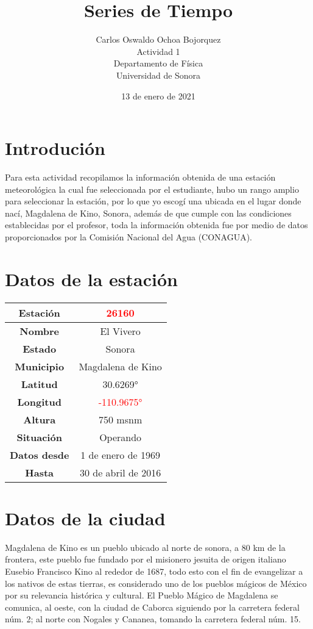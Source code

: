 \documentclass{article}
\title{Series de Tiempo}
\author{Carlos Oswaldo Ochoa Bojorquez\\
Actividad 1\\
Departamento de Física\\
Universidad de Sonora}
\date{13 de enero de 2021}
\begin{document}
\maketitle

\section{Introdución}
Para esta actividad recopilamos la información obtenida de una estación meteorológica la cual fue seleccionada por el estudiante, hubo un rango amplio para seleccionar la estación, por lo que yo escogí una ubicada en el lugar donde nací, Magdalena de Kino, Sonora, además de que cumple con las condiciones establecidas por el profesor, toda la información obtenida fue por medio de datos proporcionados por la  Comisión Nacional del Agua (CONAGUA).

\section{Datos de la estación}
\begin{center}
\begin{tabular}{|c|c|} \hline
   \textbf{Estación}  & \textcolor{red}{26160} \\ \hline
    \textbf{Nombre} & El Vivero \\ \hline
    \textbf{Estado} & Sonora \\ \hline
    \textbf{Municipio}& Magdalena de Kino \\ \hline
    \textbf{Latitud} & 30.6269° \\ \hline
    \textbf{Longitud} & \textcolor{red}{-110.9675°} \\ \hline
    \textbf{Altura} & 750 msnm \\ \hline
    \textbf{Situación} & Operando \\ \hline
    \textbf{Datos desde} & 1 de enero de 1969 \\ \hline
    \textbf{Hasta} & 30 de abril de 2016 \\ \hline
\end{tabular}    
\end{center}

\section{Datos de la ciudad}
Magdalena de Kino es un pueblo ubicado al norte de sonora, a 80 km de la frontera, este pueblo fue fundado por el misionero jesuita de origen italiano Eusebio Francisco Kino al rededor de 1687, todo esto con el fin de evangelizar a los nativos de estas tierras, es considerado uno de los pueblos mágicos de México por su relevancia histórica y cultural. El Pueblo Mágico de Magdalena se comunica, al oeste, con la ciudad de Caborca siguiendo por la carretera federal núm. 2; al norte con Nogales y Cananea, tomando la carretera federal núm. 15.
\end{document}
